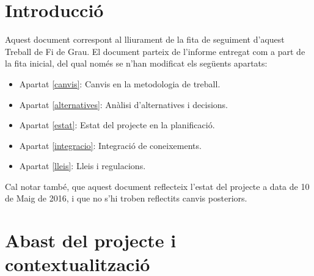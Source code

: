 \documentclass[10pt,a4paper]{article}
\author{
    Sánchez Ferreres, Josep\\
}
\title{}
\begin{document}
\begin{titlepage}
    \vfill
    

\thispagestyle{empty}
\end{titlepage}

\tableofcontents

\clearpage

\section{Introducció}

Aquest document correspont al lliurament de la fita de seguiment d'aquest Treball de Fi de Grau. El document parteix de l'informe entregat com a part de la fita inicial, del qual només se n'han modificat els següents apartats:

\begin{itemize}
    \item Apartat \ref{canvis}: Canvis en la metodologia de treball.
    \item Apartat \ref{alternatives}: Anàlisi d'alternatives i decisions.
    \item Apartat \ref{estat}: Estat del projecte en la planificació.
    \item Apartat \ref{integracio}: Integració de coneixements.
    \item Apartat \ref{lleis}: Lleis i regulacions.
\end{itemize}

Cal notar també, que aquest document reflecteix l'estat del projecte a data de 10 de Maig de 2016, i que no s'hi troben reflectits canvis posteriors.


\section{Abast del projecte i contextualització}
\end{document}

